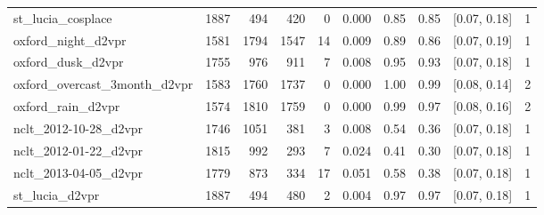 \begin{table}[t]
\begin{tabular}{l rr rr r r r c r}
st\_lucia\_cosplace & 1887 & 494 & 420 & 0 & 0.000 & 0.85 & 0.85 & [0.07, 0.18] & 1 \\
oxford\_night\_d2vpr & 1581 & 1794 & 1547 & 14 & 0.009 & 0.89 & 0.86 & [0.07, 0.19] & 1 \\
oxford\_dusk\_d2vpr & 1755 & 976 & 911 & 7 & 0.008 & 0.95 & 0.93 & [0.07, 0.18] & 1 \\
oxford\_overcast\_3month\_d2vpr & 1583 & 1760 & 1737 & 0 & 0.000 & 1.00 & 0.99 & [0.08, 0.14] & 2 \\
oxford\_rain\_d2vpr & 1574 & 1810 & 1759 & 0 & 0.000 & 0.99 & 0.97 & [0.08, 0.16] & 2 \\
nclt\_2012-10-28\_d2vpr & 1746 & 1051 & 381 & 3 & 0.008 & 0.54 & 0.36 & [0.07, 0.18] & 1 \\
nclt\_2012-01-22\_d2vpr & 1815 & 992 & 293 & 7 & 0.024 & 0.41 & 0.30 & [0.07, 0.18] & 1 \\
nclt\_2013-04-05\_d2vpr & 1779 & 873 & 334 & 17 & 0.051 & 0.58 & 0.38 & [0.07, 0.18] & 1 \\
st\_lucia\_d2vpr & 1887 & 494 & 480 & 2 & 0.004 & 0.97 & 0.97 & [0.07, 0.18] & 1 \\
\bottomrule
\end{tabular}
\end{table}